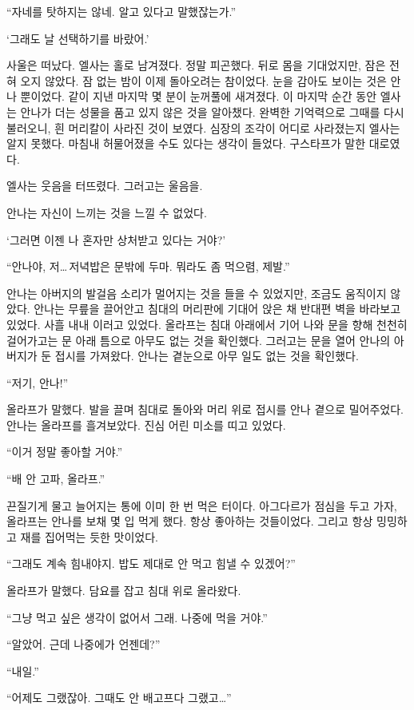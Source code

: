 ``자네를 탓하지는 않네. 알고 있다고 말했잖는가.''

`그래도 날 선택하기를 바랐어.'

사울은 떠났다. 엘사는 홀로 남겨졌다. 정말 피곤했다. 뒤로 몸을 기대었지만, 잠은 전혀 오지 않았다. 잠 없는 밤이 이제 돌아오려는 참이었다. 눈을 감아도 보이는 것은 안나 뿐이었다. 같이 지낸 마지막 몇 분이 눈꺼풀에 새겨졌다. 이 마지막 순간 동안 엘사는 안나가 더는 성물을 품고 있지 않은 것을 알아챘다. 완벽한 기억력으로 그때를 다시 불러오니, 흰 머리칼이 사라진 것이 보였다. 심장의 조각이 어디로 사라졌는지 엘사는 알지 못했다. 마침내 허물어졌을 수도 있다는 생각이 들었다. 구스타프가 말한 대로였다.

엘사는 웃음을 터뜨렸다. 그러고는 울음을.

안나는 자신이 느끼는 것을 느낄 수 없었다.

`그러면 이젠 나 혼자만 상처받고 있다는 거야?'

\textbreak

\forceindent``안나야, 저\ldots\,저녁밥은 문밖에 두마. 뭐라도 좀 먹으렴, 제발.''

안나는 아버지의 발걸음 소리가 멀어지는 것을 들을 수 있었지만, 조금도 움직이지 않았다. 안나는 무릎을 끌어안고 침대의 머리판에 기대어 앉은 채 반대편 벽을 바라보고 있었다. 사흘 내내 이러고 있었다. 올라프는 침대 아래에서 기어 나와 문을 향해 천천히 걸어가고는 문 아래 틈으로 아무도 없는 것을 확인했다. 그러고는 문을 열어 안나의 아버지가 둔 접시를 가져왔다. 안나는 곁눈으로 아무 일도 없는 것을 확인했다.

``저기, 안나!''

올라프가 말했다. 발을 끌며 침대로 돌아와 머리 위로 접시를 안나 곁으로 밀어주었다. 안나는 올라프를 흘겨보았다. 진심 어린 미소를 띠고 있었다.

``이거 정말 좋아할 거야.''

``배 안 고파, 올라프.''

끈질기게 물고 늘어지는 통에 이미 한 번 먹은 터이다. 아그다르가 점심을 두고 가자, 올라프는 안나를 보채 몇 입 먹게 했다. 항상 좋아하는 것들이었다. 그리고 항상 밍밍하고 재를 집어먹는 듯한 맛이었다.

``그래도 계속 힘내야지. 밥도 제대로 안 먹고 힘낼 수 있겠어?''

올라프가 말했다. 담요를 잡고 침대 위로 올라왔다.

``그냥 먹고 싶은 생각이 없어서 그래. 나중에 먹을 거야.''

``알았어. 근데 나중에가 언젠데?''

``내일.''

``어제도 그랬잖아. 그때도 안 배고프다 그랬고\ldots''

